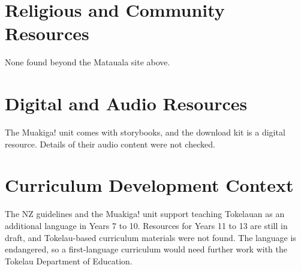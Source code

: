\documentclass[12pt]{article}
\begin{document}
\section{Religious and Community Resources}
None found beyond the Matauala site above.

\section{Digital and Audio Resources}
The Muakiga! unit comes with storybooks, and the download kit is a digital resource. Details of their audio content were not checked.

\section{Curriculum Development Context}
The NZ guidelines and the Muakiga! unit support teaching Tokelauan as an additional language in Years 7 to 10. Resources for Years 11 to 13 are still in draft, and Tokelau-based curriculum materials were not found. The language is endangered, so a first-language curriculum would need further work with the Tokelau Department of Education.
\end{document}
